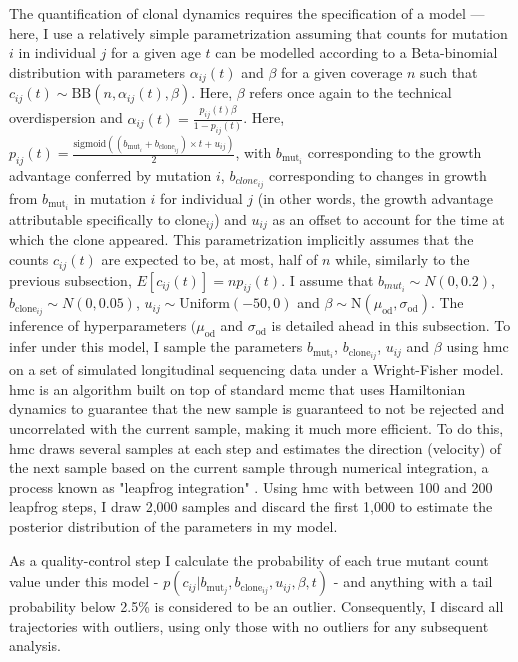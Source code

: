 The quantification of clonal dynamics requires the specification of a model --- here, I use a relatively simple parametrization assuming that counts for mutation $i$ in individual $j$ for a given age $t$ can be modelled according to a Beta-binomial distribution with parameters $\alpha_{ij}(t)$ and $\beta$ for a given coverage $n$ such that $c_{ij}(t) \sim \mathrm{BB}(n,\alpha_{ij}(t),\beta)$. Here, $\beta$ refers once again to the technical overdispersion and $\alpha_{ij}(t) = \frac{p_{ij}(t)\beta}{1-p_{ij}(t)}$. Here, $p_{ij}(t) = \frac{\mathrm{sigmoid}((b_{\mathrm{mut}_i} + b_{\mathrm{clone}_{ij}}) \times t + u_{ij})}{2}$, with $b_{\mathrm{mut}_i}$ corresponding to the growth advantage conferred by mutation $i$, $b_{clone_{ij}}$ corresponding to changes in growth from $b_{\mathrm{mut}_i}$ in mutation $i$ for individual $j$ (in other words, the growth advantage attributable specifically to $\mathrm{clone}_{ij}$) and $u_{ij}$ as an offset to account for the time at which the clone appeared. This parametrization implicitly assumes that the counts $c_{ij}(t)$ are expected to be, at most, half of $n$ while, similarly to the previous subsection, $E[c_{ij}(t)] = np_{ij}(t)$. I assume that $b_{mut_i} \sim N(0,0.2)$, $b_{\mathrm{clone}_{ij}} \sim N(0,0.05)$, $u_{ij} \sim \mathrm{Uniform}(-50,0)$ and $\beta \sim \mathrm{N}(\mu_{\mathrm{od}},\sigma_{\mathrm{od}})$. The inference of hyperparameters $(\mu_{\mathrm{od}}$ and $\sigma_{\mathrm{od}}$ is detailed ahead in this subsection. To infer under this model, I sample the parameters $b_{\mathrm{mut}_i}$, $b_{\mathrm{clone}_{ij}}$, $u_{ij}$ and $\beta$ using \ac{hmc} on a set of simulated longitudinal sequencing data under a Wright-Fisher model. \Ac{hmc} is an algorithm built on top of standard \ac{mcmc} that uses Hamiltonian dynamics to guarantee that the new sample is guaranteed to not be rejected and uncorrelated with the current sample, making it much more efficient. To do this, \ac{hmc} draws several samples at each step and estimates the direction (velocity) of the next sample based on the current sample through numerical integration, a process known as "leapfrog integration" \cite{Neal2011-lj}. Using \ac{hmc} with between 100 and 200 leapfrog steps, I draw 2,000 samples and discard the first 1,000 to estimate the posterior distribution of the parameters in my model.

As a quality-control step I calculate the probability of each true mutant count value under this model - $p(c_{ij}|b_{\mathrm{mut}_j},b_{\mathrm{clone}_{ij}},u_{ij},\beta,t)$ - and anything with a tail probability below 2.5\% is considered to be an outlier. Consequently, I discard all trajectories with outliers, using only those with no outliers for any subsequent analysis.


